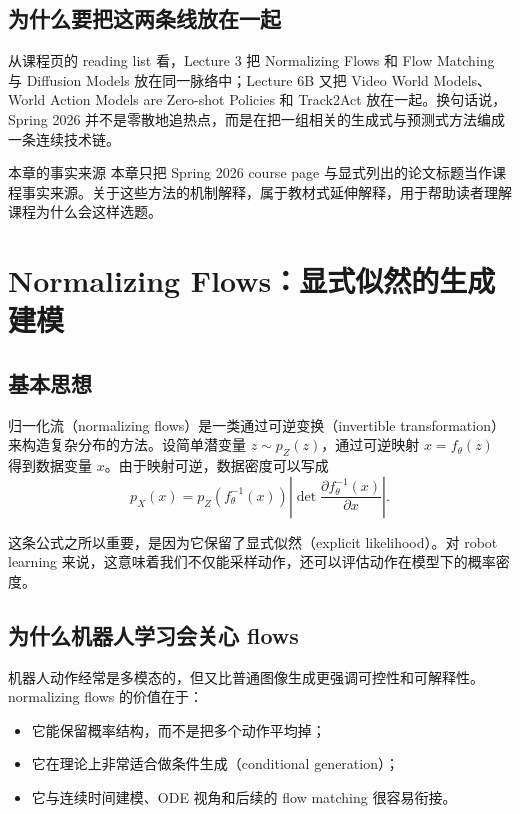 \documentclass[a4paper]{article}
\begin{document}
\subsection{为什么要把这两条线放在一起}

从课程页的 reading list 看，Lecture 3 把 Normalizing Flows 和 Flow Matching 与 Diffusion Models 放在同一脉络中；Lecture 6B 又把 Video World Models、World Action Models are Zero-shot Policies 和 Track2Act 放在一起。换句话说，Spring 2026 并不是零散地追热点，而是在把一组相关的生成式与预测式方法编成一条连续技术链。

\begin{warningbox}{本章的事实来源}
本章只把 Spring 2026 course page 与显式列出的论文标题当作课程事实来源。关于这些方法的机制解释，属于教材式延伸解释，用于帮助读者理解课程为什么会这样选题。
\end{warningbox}

\section{Normalizing Flows：显式似然的生成建模}

\subsection{基本思想}

归一化流（normalizing flows）是一类通过可逆变换（invertible transformation）来构造复杂分布的方法。设简单潜变量 \(z \sim p_Z(z)\)，通过可逆映射 \(x=f_\theta(z)\) 得到数据变量 \(x\)。由于映射可逆，数据密度可以写成
\[
p_X(x) = p_Z(f_\theta^{-1}(x)) \left|\det \frac{\partial f_\theta^{-1}(x)}{\partial x}\right|.
\]

这条公式之所以重要，是因为它保留了显式似然（explicit likelihood）。对 robot learning 来说，这意味着我们不仅能采样动作，还可以评估动作在模型下的概率密度。

\subsection{为什么机器人学习会关心 flows}

机器人动作经常是多模态的，但又比普通图像生成更强调可控性和可解释性。normalizing flows 的价值在于：
\begin{itemize}
  \item 它能保留概率结构，而不是把多个动作平均掉；
  \item 它在理论上非常适合做条件生成（conditional generation）；
  \item 它与连续时间建模、ODE 视角和后续的 flow matching 很容易衔接。
\end{itemize}
\end{document}
